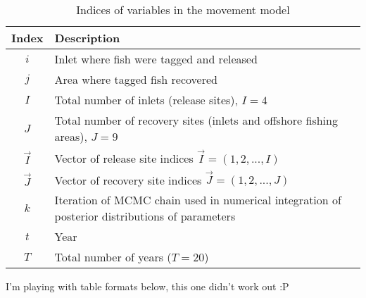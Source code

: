 \documentclass[12pt]{article}
\newcommand{\sj}[1]{{\color{red}\mbox{}\marginpar{\raggedleft\hspace{0pt}*} #1}}
\newcommand{\vJ}{\vec{J}}
\newcommand{\vI}{\vec{I}}
\begin{document}
\begin{table}[!h]
\begin{center}
\begin{tabular}{c | l}

\hline
Index & Description \\
\hline
$i$ & Inlet where fish were tagged and released \\
$j$ & Area where tagged fish recovered \\
$I$ & Total number of inlets (release sites), $I = 4$ \\
$J$ & Total number of recovery sites (inlets and offshore fishing areas), $J = 9$ \\
$\vI$ & Vector of release site indices $\vI = (1,2,...,I)$ \\
$\vJ$ & Vector of recovery site indices $\vJ = (1,2,...,J)$ \\
$k$ & Iteration of MCMC chain used in numerical integration of posterior distributions of parameters \\
$t$ & Year \\
$T$ & Total number of years ($T = 20$) \\
\hline
\end{tabular}
\caption{Indices of variables in the movement model}\label{tab:indices}
\end{center}
\end{table}


\sj{I'm playing with table formats below, this one didn't work out :P}
\end{document}
